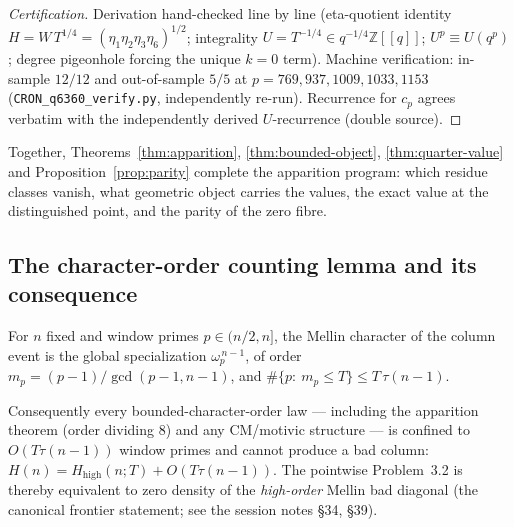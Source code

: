 \begin{proof}[Certification]
Derivation hand-checked line by line (eta-quotient identity
$H=W\,T^{1/4}=(\eta_1\eta_2\eta_3\eta_6)^{1/2}$; integrality
$U=T^{-1/4}\in q^{-1/4}\mathbb Z[[q]]$; $U^p\equiv U(q^p)$; degree
pigeonhole forcing the unique $k=0$ term).  Machine verification: in-sample
$12/12$ and out-of-sample $5/5$ at $p=769,937,1009,1033,1153$
(\texttt{CRON\_q6360\_verify.py}, independently re-run).  Recurrence for
$c_p$ agrees verbatim with the independently derived $U$-recurrence
(double source).
\end{proof}

\noindent Together, Theorems~\ref{thm:apparition}, \ref{thm:bounded-object},
\ref{thm:quarter-value} and Proposition~\ref{prop:parity} complete the
apparition program: which residue classes vanish, what geometric object
carries the values, the exact value at the distinguished point, and the
parity of the zero fibre.

\subsection{The character-order counting lemma and its consequence}

\begin{lemma}\label{lem:counting}
For $n$ fixed and window primes $p\in(n/2,n]$, the Mellin character of the
column event is the global specialization $\omega_p^{\,n-1}$, of order
$m_p=(p-1)/\gcd(p-1,n-1)$, and
$\#\{p:\ m_p\le T\}\le T\,\tau(n-1)$.
\end{lemma}

\noindent Consequently every bounded-character-order law — including the
apparition theorem (order dividing $8$) and any CM/motivic structure — is
confined to $O(T\tau(n-1))$ window primes and cannot produce a bad column:
$H(n)=H_{\mathrm{high}}(n;T)+O(T\tau(n-1))$.  The pointwise Problem~3.2 is
thereby equivalent to zero density of the \emph{high-order} Mellin bad
diagonal (the canonical frontier statement; see the session notes \S34, \S39).
